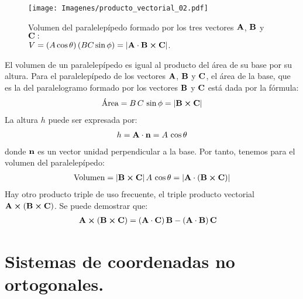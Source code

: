 \begin{figure}[H]
    \centering
    \texttt{[image: Imagenes/producto\_vectorial\_02.pdf]}
    \caption{Volumen del paralelepípedo formado por los tres vectores $\vb{A}$, $\vb{B}$ y $\vb{C}:$ \\ \centering $ V = \left( A \cos \theta \right) \left( B C \sin \phi \right) = \abs{\vb{A} \cdot \vb{B} \cp \vb{C}}$.}
    \label{fig:figura_01_11}
\end{figure}
El volumen de un paralelepípedo es igual al producto del área de su base por su altura. Para el paralelepípedo de los vectores $\vb{A}$, $\vb{B}$ y $\vb{C}$, el área de la base, que es la del paralelogramo formado por los vectores $\vb{B}$ y $\vb{C}$ está dada por la fórmula: 
\begin{align}
\text{Área} = B \, C \, \sin \phi = \abs{\vb{B} \cp \vb{C}}
\label{eq:ecuacion_01_29} 
\end{align}
La altura $h$ puede ser expresada por:
\begin{align*}
h =\vb{A} \cdot \vb{n} = A \, \cos \theta
\end{align*}
donde $\vb{n}$ es un vector unidad perpendicular a la base. Por tanto, tenemos para el volumen del paralelepípedo: 
\begin{align}
\text{Volumen} =  \abs{\vb{B} \cp \vb{C}} \, A \, \cos \theta = \abs{\vb{A} \cdot \left( \vb{B} \cp \vb{C} \right)} 
\label{eq:ecuacion_01_30}
\end{align}
Hay otro producto triple de uso frecuente, el triple producto vectorial $\vb{A} \cp \left( \vb{B} \cp \vb{C} \right)$. Se puede demostrar que:
\begin{align}
\vb{A} \cp \left( \vb{B} \cp \vb{C} \right) &= \left( \vb{A} \cdot \vb{C} \right) \vb{B} - \left( \vb{A} \cdot \vb{B} \right) \vb{C} 
\label{eq:ecuacion_01_31}
\end{align}

\section{Sistemas de coordenadas no ortogonales.}


